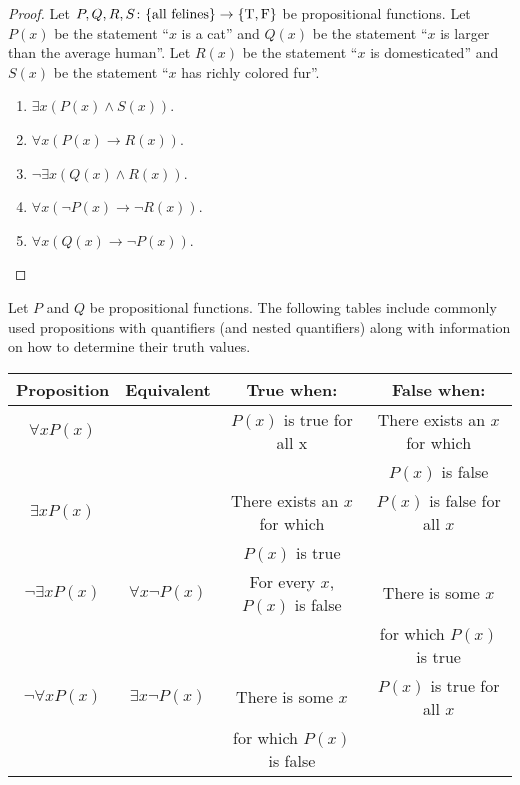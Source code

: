 \documentclass[../main.tex]{subfiles}
\begin{document}
\begin{proof} 
    Let $P, Q, R, S\colon \{\text{all felines}\} \rightarrow \{\text T, \text F \}$ be propositional functions. Let $P(x)$ be the statement ``$x$ is a cat'' and $Q(x)$ be the statement ``$x$ is larger than the average human''. Let $R(x)$ be the statement ``$x$ is domesticated'' and $S(x)$ be the statement ``$x$ has richly colored fur''.
    \begin{enumerate}[label=(\alph*)]
        \item $\exists x (P(x) \land S(x)) $.
        \item $\forall x (P(x) \rightarrow R(x))$.
        \item $\neg \exists x (Q(x) \land R(x))$.
        \item $\forall x(\neg P(x) \rightarrow \neg R(x))$.
        \item $\forall x(Q(x) \rightarrow \neg P(x))$.
        \qedhere
    \end{enumerate}
\end{proof}
Let $P$ and $Q$ be propositional functions. The following tables include commonly used propositions with quantifiers (and nested quantifiers) along with information on how to determine their truth values.
\begin{center}
    \begin{tabular}{c|c|c|c}
        Proposition & Equivalent & True when: & False when: \\
        \hline
        $\forall x P(x)$ && $P(x)$ is true for all x & There exists an $x$ for which\\
        &&& $P(x)$ is false \\
        \hline
        $\exists x P(x)$ && There exists an $x$ for which & $P(x)$ is false for all $x$ \\
        && $P(x)$ is true & \\
        \hline
        $\neg \exists x P(x)$ & $\forall x \neg P(x)$ & For every $x$, $P(x)$ is false & There is some $x$ \\
        & & & for which $P(x)$ is true  \\  
        \hline
        $\neg \forall x P(x)$ & $\exists x \neg P(x)$ & There is some $x$ & $P(x)$ is true for all $x$ \\
         & & for which $P(x)$ is false &
    \end{tabular}
\end{center}
\end{document}
